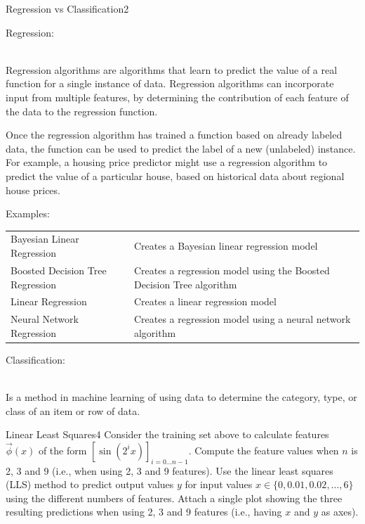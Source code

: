 \begin{questions}
\begin{question}{Regression vs Classification}{2}
\begin{answer}
					\begin{large}
						Regression:
					\end{large}
					\\Regression algorithms are algorithms that learn to predict the value of a real function for a single instance of data. Regression algorithms can incorporate input from multiple features, by determining the contribution of each feature of the data to the regression function. 
					
					Once the regression algorithm has trained a function based on already labeled data, the function can be used to predict the label of a new (unlabeled) instance. For example, a housing price predictor might use a regression algorithm to predict the value of a particular house, based on historical data about regional house prices.
					
					Examples:\\
					\begin{tabular}{l l }
						Bayesian Linear Regression & Creates a Bayesian linear regression model\\
						Boosted Decision Tree Regression & Creates a regression model using the Boosted Decision Tree algorithm \\
						Linear Regression & Creates a linear regression model \\
						Neural Network Regression & Creates a regression model using a neural network algorithm \\
						
					\end{tabular}
					
					\begin{large}
						Classification:
					\end{large}
					\\Is a method in machine learning of using data to determine the category, type, or class of an item or row of data. 
	\end{answer}
	\end{question}
	
	
	
	\begin{question}{Linear Least Squares}{4}
		Consider the training set above to calculate features $\vec{\phi}(x)$ of the form $[\sin(2^{i}x)]_{i = 0 \ldots n-1}$. 
		Compute the feature values when $n$ is 2, 3 and 9 (i.e., when using 2, 3 and 9 features). 
		Use the linear least squares (LLS) method to predict output values $y$ for input values $x\in\{0, 0.01, 0.02, \ldots, 6\}$ using the different numbers of features. 
		Attach a single plot showing the three resulting predictions when using 2, 3 and 9 features (i.e., having $x$ and $y$ as axes).
		

\end{question}
\end{questions}
